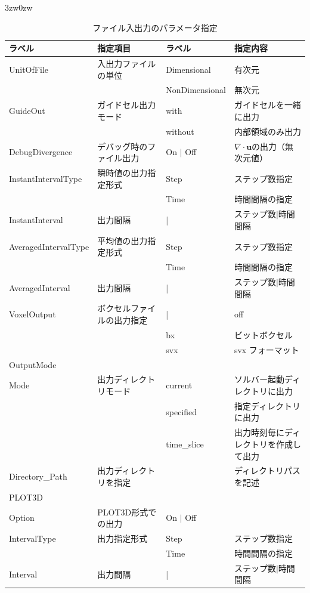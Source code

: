 \begin{indentation}{3zw}{0zw}
\begin{table}[htdp]
\caption{ファイル入出力のパラメータ指定}
\begin{center}
\small
\begin{tabular}{llll} \toprule
ラベル & 指定項目 & ラベル & 指定内容 \\ \midrule
UnitOfFile & 入出力ファイルの単位 & Dimensional & 有次元\\
& & NonDimensional & 無次元\\ \hline
GuideOut & ガイドセル出力モード & with & ガイドセルを一緒に出力\\
& & without & 内部領域のみ出力\\ \hline
DebugDivergence & デバッグ時のファイル出力 & On $|$ Off & $\nabla \cdot \bm{u}$の出力（無次元値）\\ \hline
InstantIntervalType & 瞬時値の出力指定形式 & Step & ステップ数指定\\
& & Time & 時間間隔の指定\\
InstantInterval & 出力間隔 & | & ステップ数$|$時間間隔\\ \hline
AveragedIntervalType & 平均値の出力指定形式 & Step & ステップ数指定\\
& & Time & 時間間隔の指定\\
AveragedInterval & 出力間隔 & | & ステップ数$|$時間間隔\\ \hline
VoxelOutput & ボクセルファイルの出力指定 & | & off\\
 & & bx & ビットボクセル\\
 & & svx & svx フォーマット\\ \hline
OutputMode & & & \\
Mode & 出力ディレクトリモード & current & ソルバー起動ディレクトリに出力\\
 & & specified & 指定ディレクトリに出力\\
 & & time\_slice & 出力時刻毎にディレクトリを作成して出力\\
Directory\_Path & 出力ディレクトリを指定 & & ディレクトリパスを記述\\ \hline
PLOT3D & & & \\
Option & PLOT3D形式での出力 & On $|$ Off & \\
IntervalType & 出力指定形式 & Step & ステップ数指定\\
 & & Time & 時間間隔の指定\\
Interval & 出力間隔 & | & ステップ数$|$時間間隔\\
\bottomrule
\end{tabular}
\end{center}
\label{tbl:file_IO_parameter}
\end{table}



\end{indentation}
